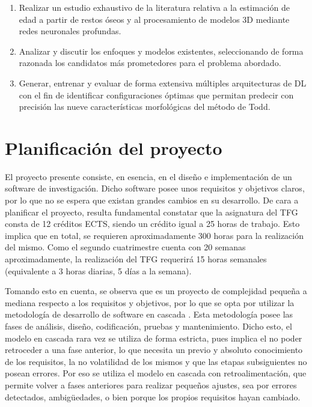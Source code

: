 \begin{enumerate}
    \item Realizar un estudio exhaustivo de la literatura relativa a la estimación de edad a partir de restos óseos y al procesamiento de modelos 3D mediante redes neuronales profundas.
    \item Analizar y discutir los enfoques y modelos existentes, seleccionando de forma razonada los candidatos más prometedores para el problema abordado.
    \item Generar, entrenar y evaluar de forma extensiva múltiples arquitecturas de DL con el fin de identificar configuraciones óptimas que permitan predecir con precisión las nueve características morfológicas del método de Todd.
\end{enumerate}

\section{Planificación del proyecto}


El proyecto presente consiste, en esencia, en el diseño e implementación de un software de investigación. Dicho software posee unos requisitos y objetivos claros, por lo que no se espera que existan grandes cambios en su desarrollo. De cara a planificar el proyecto, resulta fundamental constatar que la asignatura del TFG consta de 12 créditos ECTS, siendo un crédito igual a 25 horas de trabajo. Esto implica que en total, se requieren aproximadamente 300 horas para la realización del mismo. Como el segundo cuatrimestre cuenta con 20 semanas aproximadamente, la realización del TFG requerirá 15 horas semanales (equivalente a 3 horas diarias, 5 días a la semana).

Tomando esto en cuenta, se observa que es un proyecto de complejidad pequeña a mediana respecto a los requisitos y objetivos, por lo que se opta por utilizar la metodología de desarrollo de software en cascada \cite{pressman2005software}. Esta metodología posee las fases de análisis, diseño, codificación, pruebas y mantenimiento. Dicho esto, el modelo en cascada rara vez se utiliza de forma estricta, pues implica el no poder retroceder a una fase anterior, lo que necesita un previo y absoluto conocimiento de los requisitos, la no volatilidad de los mismos y que las etapas subsiguientes no posean errores. Por eso se utiliza el modelo en cascada con retroalimentación, que permite volver a fases anteriores para realizar pequeños ajustes, sea por errores detectados, ambigüedades, o bien porque los propios requisitos hayan cambiado.

